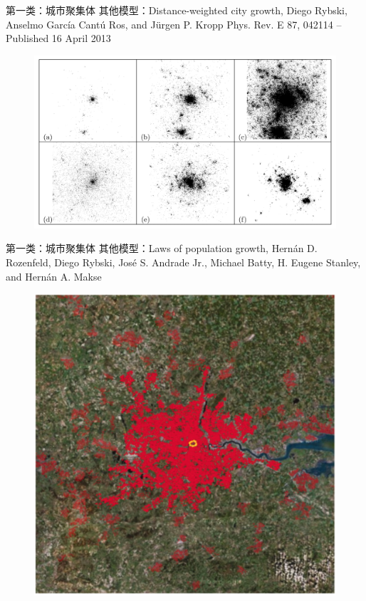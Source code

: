 \documentclass[utf8]{ctexbeamer}
\begin{document}
\begin{frame}{第一类：城市聚集体}
    其他模型：Distance-weighted city growth, 
    Diego Rybski, Anselmo García Cantú Ros, and Jürgen P. Kropp
    Phys. Rev. E 87, 042114 – Published 16 April 2013

    \begin{figure}
        \includegraphics[width = 1\linewidth]{图片/distance-weighted.png}
    \end{figure}
\end{frame}

\begin{frame}{第一类：城市聚集体}
    其他模型：Laws of population growth, Hernán D. Rozenfeld, Diego Rybski, José S. Andrade Jr., Michael Batty, H. Eugene Stanley, and Hernán A. Makse

    \begin{figure}
        \includegraphics[width = 0.5\linewidth]{图片/cca.png}
    \end{figure}
\end{frame}
\end{document}
